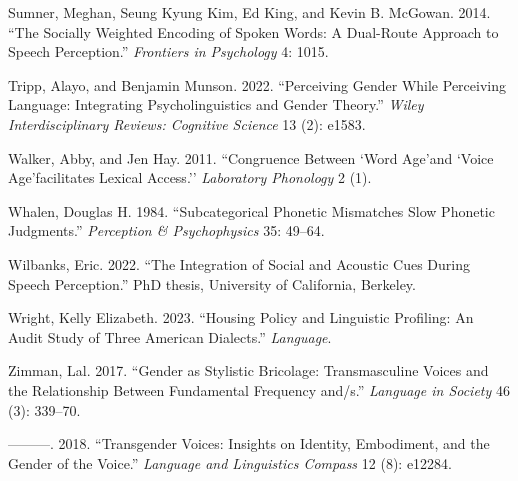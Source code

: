 \documentclass[
  letterpaper,
  DIV=11,
  numbers=noendperiod]{scrartcl}
\newlength{\cslhangindent}
\newenvironment{CSLReferences}[2] %
 {\begin{list}{}{%
  \setlength{\itemindent}{0pt}
  \setlength{\leftmargin}{0pt}
  \setlength{\parsep}{0pt}
  \ifodd #1
   \setlength{\leftmargin}{\cslhangindent}
   \setlength{\itemindent}{-1\cslhangindent}
  \fi
  \setlength{\itemsep}{#2\baselineskip}}}
 {\end{list}}
\begin{document}
\begin{CSLReferences}{1}{0}
Sumner, Meghan, Seung Kyung Kim, Ed King, and Kevin B. McGowan. 2014.
{``The Socially Weighted Encoding of Spoken Words: A Dual-Route Approach
to Speech Perception.''} \emph{Frontiers in Psychology} 4: 1015.

Tripp, Alayo, and Benjamin Munson. 2022. {``Perceiving Gender While
Perceiving Language: Integrating Psycholinguistics and Gender Theory.''}
\emph{Wiley Interdisciplinary Reviews: Cognitive Science} 13 (2): e1583.

Walker, Abby, and Jen Hay. 2011. {``Congruence Between `Word Age'and
`Voice Age'facilitates Lexical Access.''} \emph{Laboratory Phonology} 2
(1).

Whalen, Douglas H. 1984. {``Subcategorical Phonetic Mismatches Slow
Phonetic Judgments.''} \emph{Perception \& {Psychophysics}} 35: 49--64.

Wilbanks, Eric. 2022. {``The Integration of Social and Acoustic Cues
During Speech Perception.''} PhD thesis, University of California,
Berkeley.

Wright, Kelly Elizabeth. 2023. {``Housing Policy and Linguistic
Profiling: An Audit Study of Three American Dialects.''}
\emph{Language}.

Zimman, Lal. 2017. {``Gender as Stylistic Bricolage: Transmasculine
Voices and the Relationship Between Fundamental Frequency and/s.''}
\emph{Language in Society} 46 (3): 339--70.

---------. 2018. {``Transgender Voices: Insights on Identity,
Embodiment, and the Gender of the Voice.''} \emph{Language and
Linguistics Compass} 12 (8): e12284.

\end{CSLReferences}
\end{document}
